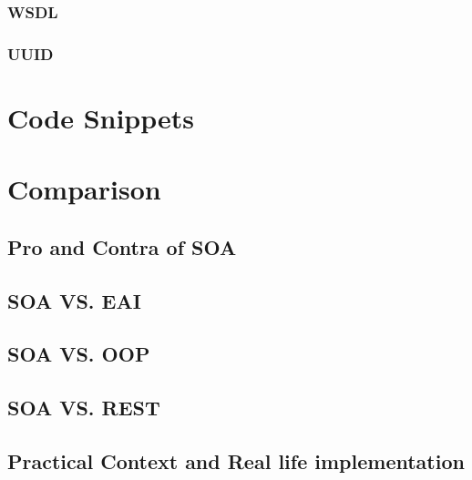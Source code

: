 \documentclass[10pt]{article}
\begin{document}
\subsubsection{WSDL}
\subsubsection{UUID}


\section{Code Snippets}
\section{Comparison}
\subsection{Pro and Contra of SOA}
\subsection{SOA VS. EAI}
\subsection{SOA VS. OOP}
\subsection{SOA VS. REST}
\subsection{Practical Context and Real life implementation}







\listoftables
\listoffigures
\printglossaries
\end{document}

